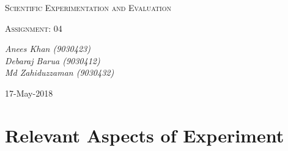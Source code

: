 \documentclass[10pt,a4paper]{article}
\begin{document}
				\begin{titlepage}
				\centering
			
					{\scshape\LARGE Scientific Experimentation and Evaluation\par}
			
					{\scshape\Large Assignment: 04\par}
			
					\vfill
			
					\vfill
					{\Large\itshape Anees Khan (9030423)
						\\Debaraj Barua (9030412)\\
						Md Zahiduzzaman (9030432)
						\par}
					\vfill
			
					{\large 17-May-2018\par}
				\end{titlepage}
				\tableofcontents
				\listoffigures	
				\listoftables
				\newpage
				\section{Relevant Aspects of Experiment}
\end{document}
